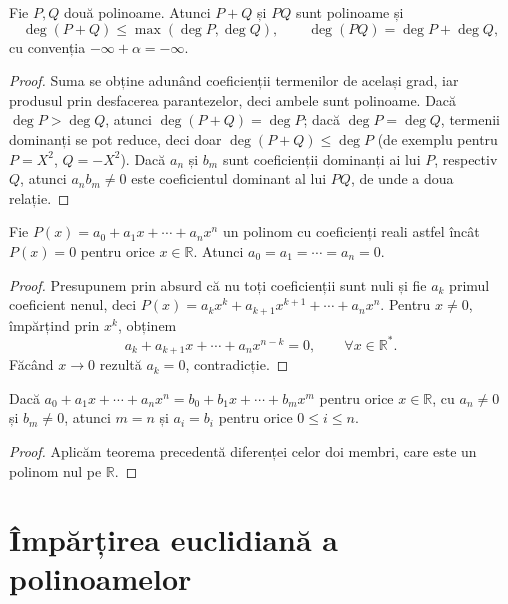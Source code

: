 \begin{propozitie}
Fie $P, Q$ două polinoame. Atunci $P + Q$ și $PQ$ sunt polinoame și
\[
\deg(P + Q) \leq \max(\deg P, \deg Q),
\qquad
\deg(PQ) = \deg P + \deg Q,
\]
cu convenția $-\infty + \alpha = -\infty$.
\end{propozitie}

\begin{proof}
Suma se obține adunând coeficienții termenilor de același grad, iar produsul prin desfacerea parantezelor, deci ambele sunt polinoame. Dacă $\deg P > \deg Q$, atunci $\deg(P+Q)=\deg P$; dacă $\deg P = \deg Q$, termenii dominanți se pot reduce, deci doar $\deg(P + Q) \leq \deg P$ (de exemplu pentru $P = X^2$, $Q = -X^2$). Dacă $a_n$ și $b_m$ sunt coeficienții dominanți ai lui $P$, respectiv $Q$, atunci $a_n b_m\neq 0$ este coeficientul dominant al lui $PQ$, de unde a doua relație.
\end{proof}

\begin{teorema}
Fie $P(x) = a_0 + a_1 x + \cdots + a_n x^n$ un polinom cu coeficienți reali astfel încât $P(x) = 0$ pentru orice $x \in \mathbb{R}$. Atunci $a_0 = a_1 = \cdots = a_n = 0$.
\end{teorema}

\begin{proof}
Presupunem prin absurd că nu toți coeficienții sunt nuli și fie $a_k$ primul coeficient nenul, deci $P(x) = a_k x^k + a_{k+1} x^{k+1} + \cdots + a_n x^n$. Pentru $x \neq 0$, împărțind prin $x^k$, obținem
\[
a_k + a_{k+1}x + \cdots + a_n x^{n-k} = 0, \qquad \forall x \in \mathbb{R}^*.
\]
Făcând $x \to 0$ rezultă $a_k = 0$, contradicție.
\end{proof}

\begin{corolar}\label{cor:identitate}
Dacă $a_0 + a_1 x + \cdots + a_n x^n = b_0 + b_1 x + \cdots + b_m x^m$ pentru orice $x\in\mathbb{R}$, cu $a_n \neq 0$ și $b_m \neq 0$, atunci $m = n$ și $a_i = b_i$ pentru orice $0 \le i \le n$.
\end{corolar}

\begin{proof}
Aplicăm teorema precedentă diferenței celor doi membri, care este un polinom nul pe $\mathbb{R}$.
\end{proof}

\section{Împărțirea euclidiană a polinoamelor}

